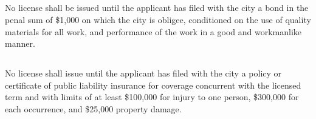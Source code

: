 \subsection{}
No license shall be issued until the applicant has filed with the city a bond in the penal sum of \$1,000 on which the city is obligee, conditioned on the use of quality materials for all work, and performance of the work in a good and workmanlike manner.
\subsection{}
No license shall issue until the applicant has filed with the city a policy or certificate of public liability insurance for coverage concurrent with the licensed term and with limits of at least \$100,000 for injury to one person, \$300,000 for each occurrence, and \$25,000 property damage.
